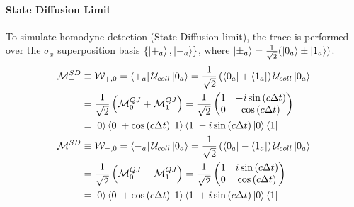 \documentclass[a4paper,12pt]{article}
\begin{document}
\paragraph{State Diffusion Limit}
To simulate homodyne detection (State Diffusion limit), the trace is performed over the $ \sigma_x $ superposition basis $ \{ \ket{+_{a}}, \ket{-_{a}} \} $, where $ \ket{\pm_{a}} = \frac{1}{\sqrt{2}} (\ket{0_a} \pm \ket{1_a}) $. 
\begin{align}
	\mathcal{M}_{+}^{SD} &\equiv \mathcal{W}_{+, 0} = \bra{+_a} \mathcal{U}_{coll} \ket{0_a} = \frac{1}{\sqrt{2}} \left( \bra{0_a} + \bra{1_a} \right) \mathcal{U}_{coll} \ket{0_a} \notag \\
	&= \frac{1}{\sqrt{2}} \left( \mathcal{M}_{0}^{QJ} + \mathcal{M}_{1}^{QJ} \right) = \frac{1}{\sqrt{2}} 
	\begin{pmatrix} 1 & -i \sin{\left(c \Delta t \right)} \\ 0 & \cos{\left(c \Delta t \right)} \end{pmatrix} \notag \\
	&= \ket{0}\bra{0} + \cos \left(c \Delta t \right) \ket{1}\bra{1} -i \sin \left(c \Delta t \right) \ket{0}\bra{1} \\ 
	\mathcal{M}_{-}^{SD} &\equiv \mathcal{W}_{-, 0} = \bra{-_a} \mathcal{U}_{coll} \ket{0_a} = \frac{1}{\sqrt{2}} \left( \bra{0_a} - \bra{1_a} \right) \mathcal{U}_{coll} \ket{0_a} \notag \\
	&= \frac{1}{\sqrt{2}} \left( \mathcal{M}_{0}^{QJ} - \mathcal{M}_{1}^{QJ} \right) = \frac{1}{\sqrt{2}} 
	\begin{pmatrix} 1 & i \sin{\left(c \Delta t \right)} \\ 0 & \cos{\left(c \Delta t \right)} \end{pmatrix} \notag \\
	&= \ket{0}\bra{0} + \cos \left(c \Delta t \right) \ket{1}\bra{1} +i \sin \left(c \Delta t \right) \ket{0}\bra{1}
\end{align}
\end{document}
